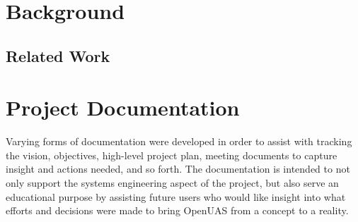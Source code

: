 \documentclass{article}
\begin{document}
\section{Background}

\subsection{Related Work}

\section{Project Documentation}

Varying forms of documentation were developed in order to assist with tracking the vision, objectives, high-level project plan, meeting documents to capture insight and actions needed, and so forth. The documentation is intended to not only support the systems engineering aspect of the project, but also serve an educational purpose by assisting future users who would like insight into what efforts and decisions were made to bring OpenUAS from a concept to a reality.
\end{document}
